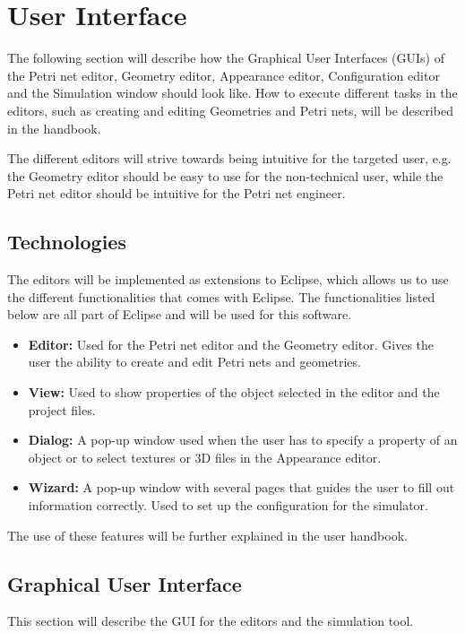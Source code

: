 \section{User Interface}
\label{sec:user-interface}

The following section will describe how the Graphical User Interfaces (GUIs) of the Petri net editor, Geometry editor, Appearance editor, Configuration editor and the Simulation window should look like. How to execute different tasks in the editors, such as creating and editing Geometries and Petri nets, will be described in the handbook. 

The different editors will strive towards being intuitive for the targeted user, e.g. the Geometry editor should be easy to use for the non-technical user, while the Petri net editor should be intuitive for the Petri net engineer.

\subsection{Technologies}
The editors will be implemented as extensions to Eclipse, which allows us to use the different functionalities that comes with Eclipse. The functionalities listed below are all part of Eclipse and will be used for this software.

\begin{itemize}
\item{\textbf{Editor:} Used for the Petri net editor and the Geometry editor. Gives the user the ability to create and edit Petri nets and geometries.}
\item{\textbf{View:} Used to show properties of the object selected in the editor and the project files.}
\item{\textbf{Dialog:} A pop-up window used when the user has to specify a property of an object or to select textures or 3D files in the Appearance editor.}
\item{\textbf{Wizard:} A pop-up window with several pages that guides the user to fill out information correctly. Used to set up the configuration for the simulator.}
\end{itemize}

The use of these features will be further explained in the user handbook. 

\subsection{Graphical User Interface}
This section will describe the GUI for the editors and the simulation tool. 

